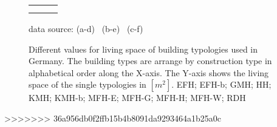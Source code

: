 \begin{figure}[htb]
\vspace{-1cm} 

\hspace{-2.5cm}
  \begin{tabular}{p{0.33\linewidth} p{0.33\linewidth} p{0.33\linewidth}}
&
&
\\

\vspace{-3cm} 
& \vspace{-3cm} 
& \vspace{-3cm}
\\
    \end{tabular}
    
\vspace{-1.6cm}
\begin{flushright}
\footnotesize{data source:
(a-d)~\cite{Blesl.2007}
(b-e)~\cite{Loga.2011}
(c-f)~\cite{Born.2003}
}
\end{flushright}
	\caption[Different values for living space of building typologies used in
	Germany.]{Different values for living space of building typologies used in
	Germany.
    The building types are arrange by construction type in alphabetical order
    along the X-axis.
	The Y-axis shows the living space of the single typologies in
	$[m^2]$.
	EFH; EFH-b; GMH; HH; KMH; KMH-b; MFH-E; MFH-G; MFH-H; MFH-W; RDH}
    \label{fig:DifTypArea}
\end{figure}
>>>>>>> 36a956db0f2ffb15b4b8091da9293464a1b25a0c
